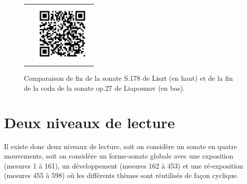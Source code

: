 \begin{figure}[!p]
\begin{bigcenter}
\begin{tabular}{lr}
      &
      \includegraphics[width=3cm, keepaspectratio]{sonate-qr.png}
    \end{tabular}
  \end{bigcenter}
  \caption{\label{sonate-fin}Comparaison de fin de la sonate S.178 de Liszt (en haut) et de la fin de la coda de la sonate op.27 de Liapounov (en bas).}
\end{figure}

\section{Deux niveaux de lecture}

Il existe donc deux niveaux de lecture, soit on considère un sonate en quatre mouvements, soit on considère un forme-sonate globale avec une exposition (mesures 1 à 161), un développement (mesures 162 à 453) et une ré-exposition (mesures 455 à 598) où les différents thèmes sont réutilisés de façon cyclique.

